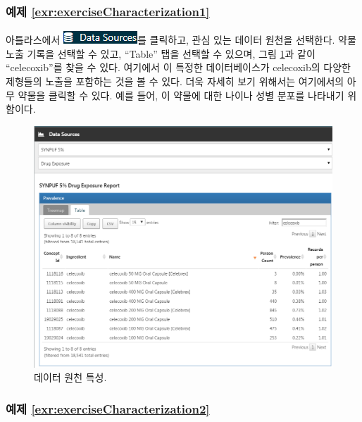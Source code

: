 \documentclass[11pt]{book}
\theoremstyle{definition}
\theoremstyle{definition}
\theoremstyle{definition}
\theoremstyle{remark}
\begin{document}
\subsubsection*{예제
\ref{exr:exerciseCharacterization1}}\label{-refexrexercisecharacterization1}

아틀라스에서
\includegraphics{images/Characterization/atlasDataSourcesMenuItem.png}를
클릭하고, 관심 있는 데이터 원천을 선택한다. 약물 노출 기록을 선택할 수
있고, ``Table'' 탭을 선택할 수 있으며, 그림 \ref{fig:dataSourcesAtlas}과
같이 ``celecoxib''를 찾을 수 있다. 여기에서 이 특정한 데이터베이스가
celecoxib의 다양한 제형들의 노출을 포함하는 것을 볼 수 있다. 더욱 자세히
보기 위해서는 여기에서의 아무 약물을 클릭할 수 있다. 예를 들어, 이
약물에 대한 나이나 성별 분포를 나타내기 위함이다.

\begin{figure}

{\centering \includegraphics[width=1\linewidth]{images/SuggestedAnswers/dataSourcesAtlas} 

}

\caption{데이터 원천 특성.}\label{fig:dataSourcesAtlas}
\end{figure}

\subsubsection*{예제
\ref{exr:exerciseCharacterization2}}\label{-refexrexercisecharacterization2}
\end{document}
